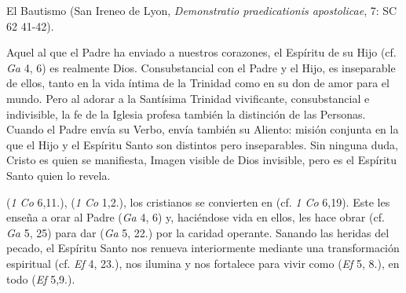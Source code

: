 	El Bautismo  (San Ireneo de Lyon, \emph{Demonstratio praedicationis apostolicae}, 7: SC 62 41-42).
	
	
	 Aquel al que el Padre ha enviado a nuestros corazones, el Espíritu de su Hijo (cf. \emph{Ga} 4, 6) es realmente Dios. Consubstancial con el Padre y el Hijo, es inseparable de ellos, tanto en la vida íntima de la Trinidad como en su don de amor para el mundo. Pero al adorar a la Santísima Trinidad vivificante, consubstancial e indivisible, la fe de la Iglesia profesa también la distinción de las Personas. Cuando el Padre envía su Verbo, envía también su Aliento: misión conjunta en la que el Hijo y el Espíritu Santo son distintos pero inseparables. Sin ninguna duda, Cristo es quien se manifiesta, Imagen visible de Dios invisible, pero es el Espíritu Santo quien lo revela.
	
	  (\emph{1 Co} 6,11.),  (\emph{1 Co} 1,2.), los cristianos se convierten en  (cf. \emph{1 Co} 6,19). Este  les enseña a orar al Padre (\emph{Ga} 4, 6) y, haciéndose vida en ellos, les hace obrar (cf. \emph{Ga} 5, 25) para dar  (\emph{Ga} 5, 22.) por la caridad operante. Sanando las heridas del pecado, el Espíritu Santo nos renueva interiormente mediante una transformación espiritual (cf. \emph{Ef} 4, 23.), nos ilumina y nos fortalece para vivir como  (\emph{Ef} 5, 8.),  en todo (\emph{Ef} 5,9.).
	
